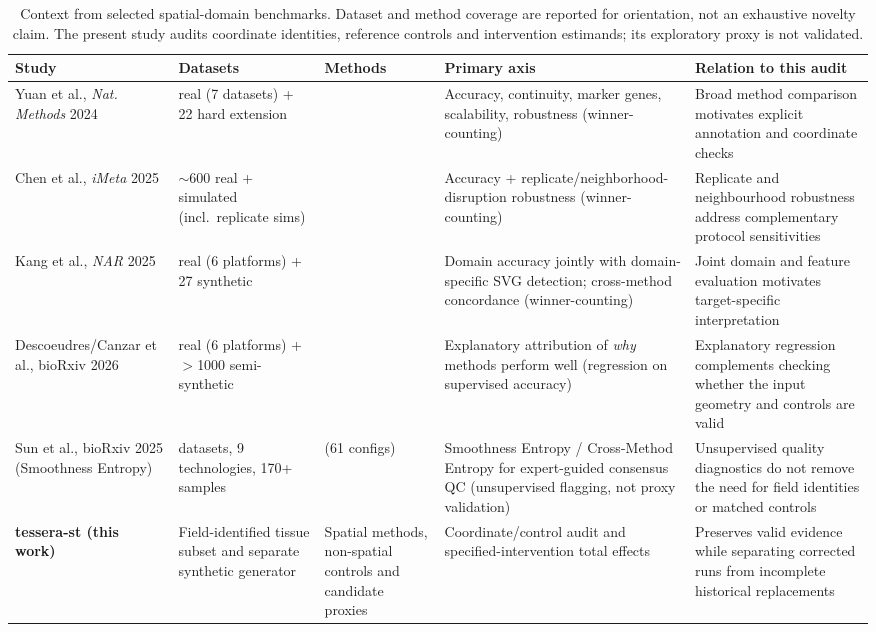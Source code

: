 \documentclass[11pt]{article}
\begin{document}
\begin{table}[!t]
\centering
\caption{Context from selected spatial-domain benchmarks. Dataset and method coverage are reported for orientation, not an exhaustive novelty claim. The present study audits coordinate identities, reference controls and intervention estimands; its exploratory proxy is not validated.}

\small
\begin{tabular}{@{}>{\raggedright\arraybackslash}p{2.6cm}>{\raggedright\arraybackslash}p{2.7cm}>{\raggedright\arraybackslash}p{2.5cm}>{\raggedright\arraybackslash}p{3.9cm}>{\raggedright\arraybackslash}p{3.3cm}@{}}
\toprule
Study & Datasets & Methods & Primary axis & Relation to this audit \\
\midrule
Yuan et al., \textit{Nat. Methods} 2024 \citep{yuan2024benchmark} &
34 real (7 datasets) + 22 hard extension &
13 &
Accuracy, continuity, marker genes, scalability, robustness (winner-counting) &
Broad method comparison motivates explicit annotation and coordinate checks \\
\addlinespace
Chen et al., \textit{iMeta} 2025 \citep{chen2025imeta} &
$\sim$600 real + simulated (incl.\ replicate sims) &
14 &
Accuracy + replicate/neighborhood-disruption robustness (winner-counting) &
Replicate and neighbourhood robustness address complementary protocol sensitivities \\
\addlinespace
Kang et al., \textit{NAR} 2025 \citep{kang2025nar} &
30 real (6 platforms) + 27 synthetic &
19 &
Domain accuracy jointly with domain-specific SVG detection; cross-method concordance (winner-counting) &
Joint domain and feature evaluation motivates target-specific interpretation \\
\addlinespace
Descoeudres/\allowbreak Canzar et al., bioRxiv 2026 \citep{canzar2026biorxiv} &
63 real (6 platforms) + $>$1000 semi-synthetic &
26 &
Explanatory attribution of \emph{why} methods perform well (regression on supervised accuracy) &
Explanatory regression complements checking whether the input geometry and controls are valid \\
\addlinespace
Sun et al., bioRxiv 2025 \citep{sun2025smoothness} (Smoothness Entropy) &
15 datasets, 9 technologies, 170+ samples &
22 (61 configs) &
Smoothness Entropy / Cross-Method Entropy for expert-guided consensus QC (unsupervised flagging, not proxy validation) &
Unsupervised quality diagnostics do not remove the need for field identities or matched controls \\
\midrule
\textbf{tessera-st (this work)} &
Field-identified tissue subset and separate synthetic generator &
Spatial methods, non-spatial controls and candidate proxies &
Coordinate/control audit and specified-intervention total effects &
Preserves valid evidence while separating corrected runs from incomplete historical replacements \\
\bottomrule
\end{tabular}
\end{table}
\end{document}
